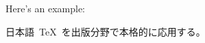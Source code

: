 \documentclass[a4paper,dvipdfmx]{article}
\begin{document}
Here's an example:\par
\begin{CJK}{UTF8}{ipxm}\CJKtilde
日本語~{\TeX}~を出版分野で本格的に応用する。\par
\par
\par
\par
\end{CJK}
\end{document}
